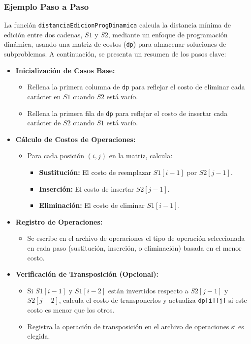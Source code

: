 \subsubsection{Ejemplo Paso a Paso}

La función \texttt{distanciaEdicionProgDinamica} calcula la distancia mínima de edición entre dos cadenas, \( S1 \) y \( S2 \), mediante un enfoque de programación dinámica, usando una matriz de costos (\texttt{dp}) para almacenar soluciones de subproblemas. A continuación, se presenta un resumen de los pasos clave:

\begin{itemize}
    \item \textbf{Inicialización de Casos Base:}
    \begin{itemize}
        \item Rellena la primera columna de \texttt{dp} para reflejar el costo de eliminar cada carácter en \( S1 \) cuando \( S2 \) está vacío.
        \item Rellena la primera fila de \texttt{dp} para reflejar el costo de insertar cada carácter de \( S2 \) cuando \( S1 \) está vacío.
    \end{itemize}
    
    \item \textbf{Cálculo de Costos de Operaciones:}
    \begin{itemize}
        \item Para cada posición \( (i, j) \) en la matriz, calcula:
        \begin{itemize}
            \item \textbf{Sustitución:} El costo de reemplazar \( S1[i-1] \) por \( S2[j-1] \).
            \item \textbf{Inserción:} El costo de insertar \( S2[j-1] \).
            \item \textbf{Eliminación:} El costo de eliminar \( S1[i-1] \).
        \end{itemize}
    \end{itemize}
    
    \item \textbf{Registro de Operaciones:} 
    \begin{itemize}
        \item Se escribe en el archivo de operaciones el tipo de operación seleccionada en cada paso (sustitución, inserción, o eliminación) basada en el menor costo.
    \end{itemize}

    \item \textbf{Verificación de Transposición (Opcional):} 
    \begin{itemize}
        \item Si \( S1[i-1] \) y \( S1[i-2] \) están invertidos respecto a \( S2[j-1] \) y \( S2[j-2] \), calcula el costo de transponerlos y actualiza \texttt{dp[i][j]} si este costo es menor que los otros.
        \item Registra la operación de transposición en el archivo de operaciones si es elegida.
    \end{itemize}


\end{itemize}
